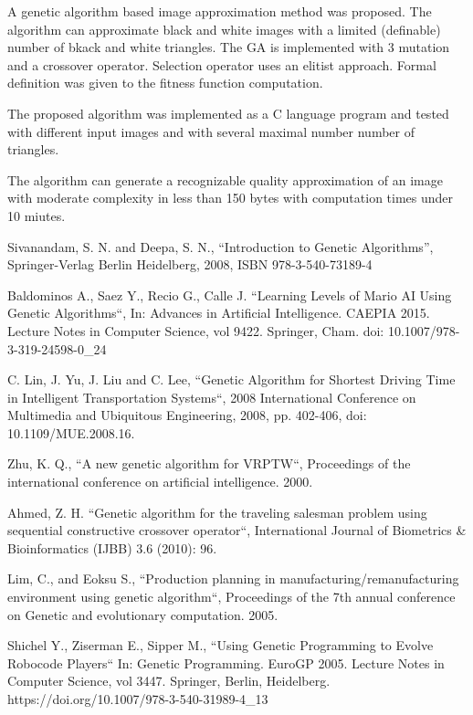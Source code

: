 \documentclass[conference]{IEEEtran}
\begin{document}
A genetic algorithm based image approximation method
was proposed. The algorithm can approximate black and
white images with a limited (definable) number of
bkack and white triangles. The GA is implemented
with 3 mutation and a crossover operator. Selection
operator uses an elitist approach. Formal definition
was given to the fitness function computation.

The proposed algorithm was implemented as a C
language program and tested with different input
images and with several maximal number number
of triangles.

The algorithm can generate a recognizable quality
approximation of an image with moderate complexity
in less than 150 bytes with computation times
under 10 miutes.

\begin{thebibliography}{00}

Sivanandam, S. N. and Deepa, S. N., ``Introduction to Genetic Algorithms'',
	Springer-Verlag Berlin Heidelberg, 2008, ISBN 978-3-540-73189-4

\vfill\eject

Baldominos A., Saez Y., Recio G., Calle J. ``Learning Levels of Mario AI Using Genetic Algorithms``,
	In: Advances in Artificial Intelligence. CAEPIA 2015. Lecture Notes in Computer Science, vol 9422. Springer, Cham. doi: 10.1007/978-3-319-24598-0\_24

C. Lin, J. Yu, J. Liu and C. Lee, ``Genetic Algorithm for Shortest Driving Time in Intelligent Transportation Systems``, 2008 International Conference on Multimedia and Ubiquitous Engineering, 2008, pp. 402-406, doi: 10.1109/MUE.2008.16.

Zhu, K. Q., ``A new genetic algorithm for VRPTW``, Proceedings of the international conference on artificial intelligence. 2000.

Ahmed, Z. H. ``Genetic algorithm for the traveling salesman problem using sequential constructive crossover operator``, International Journal of Biometrics \& Bioinformatics (IJBB) 3.6 (2010): 96.

Lim, C., and Eoksu S., ``Production planning in manufacturing/remanufacturing environment using genetic algorithm``, Proceedings of the 7th annual conference on Genetic and evolutionary computation. 2005.

Shichel Y., Ziserman E., Sipper M., ``Using Genetic Programming to Evolve Robocode Players`` In: Genetic Programming. EuroGP 2005. Lecture Notes in Computer Science, vol 3447. Springer, Berlin, Heidelberg. https://doi.org/10.1007/978-3-540-31989-4\_13


\end{thebibliography}
\end{document}
